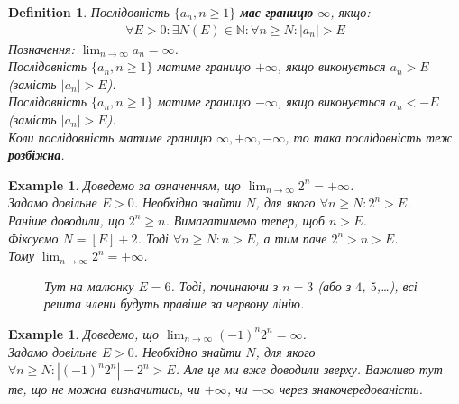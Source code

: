 \documentclass[a4paper, 14pt]{article}
\theoremstyle{theoremdd}
\theoremstyle{theoremdd}
\newtheorem{definition}[theorem]{Definition}
\theoremstyle{theoremdd}
\theoremstyle{theoremdd}
\newtheorem{example}[theorem]{Example}
\theoremstyle{theoremdd}
\theoremstyle{theoremdd}
\theoremstyle{theoremdd}
\theoremstyle{theoremdd}
\begin{document}
	\begin{definition}
	Послідовність $\{a_n, n \geq 1\}$ \textbf{має границю} $\infty$, якщо: 			\begin{align*}
	\forall E>0: \exists N(E) \in \mathbb{N}: \forall n \geq N: |a_n|>E
	\end{align*}
	Позначення: $\displaystyle\lim_{n \to \infty} a_n = \infty$.\\
	Послідовність $\{a_n, n \geq 1\}$ матиме границю $+\infty$, якщо виконується $a_n > E$ (замість $|a_n| > E$).\\
	Послідовність $\{a_n, n \geq 1\}$ матиме границю $-\infty$, якщо виконується $a_n < -E$ (замість $|a_n| > E$).\\
	Коли послідовність матиме границю $\infty, +\infty,-\infty$, то така послідовність теж \textbf{розбіжна}.
	\end{definition}
	
	\begin{example}
	Доведемо за означенням, що $\displaystyle\lim_{n \to \infty} 2^n = +\infty$.\\
	Задамо довільне $E>0$. Необхідно знайти $N$, для якого $\forall n \geq N: 2^n>E$.\\
	Раніше доводили, що $2^n \geq n$. Вимагатимемо тепер, щоб $n > E$.\\
	Фіксуємо $N=\left[ E \right] + 2$. Тоді $\forall n \geq N: n > E$, а тим паче $2^n > n > E$.\\
	Тому $\displaystyle\lim_{n \to \infty} 2^n = +\infty$.
	\begin{figure}[H]
\centering
\resizebox{0.9\textwidth}{!} {
}
\caption*{Тут на малюнку $E = 6$. Тоді, починаючи з $n=3$ (або з $4$, $5$,\dots), всі решта члени будуть правіше за червону лінію.}
\end{figure}
	\end{example}

\begin{example}
Доведемо, що $\displaystyle \lim_{n \to \infty} (-1)^n 2^n = \infty$.\\
Задамо довільне $E > 0$. Необхідно знайти $N$, для якого $\forall n \geq N: |(-1)^n 2^n| = 2^n > E$. Але це ми вже доводили зверху. Важливо тут те, що не можна визначитись, чи $+\infty$, чи $-\infty$ через знакочередованість.
\end{example}
	
\end{document}
